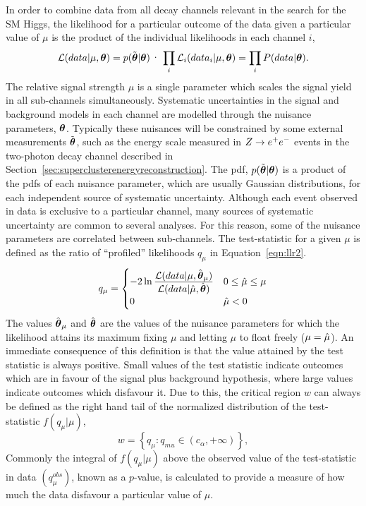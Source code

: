 In order to combine data from all decay channels relevant in the search for the
SM Higgs, the likelihood for a particular outcome of the data given a particular
value of $\mu$ is the product of the individual likelihoods in each channel $i$,
\begin{equation}
\mathcal{L}(data|\mu,\boldth)= p(\boldthmeas|\boldth)\cdot\prod_{i}\mathcal{L}_{i}(data_{i}|\mu,\boldth)
= \prod_{i}P(data|\boldth).
\label{eqn:likelihood}
\end{equation}
The relative signal strength $\mu$ is a single parameter which scales the signal
yield in all sub-channels simultaneously. 
Systematic uncertainties in the signal and background models in each channel
are modelled through the nuisance parameters, ${\boldsymbol{\theta}}$. Typically these nuisances
will be constrained by some external measurements $\tilde{{\boldsymbol{\theta}}}$, such as the energy scale
measured in $Z\rightarrow e^{+}e^{-}$ events in the two-photon decay channel described in 
Section~\ref{sec:superclusterenergyreconstruction}. 
The pdf, $p(\tilde{{\boldsymbol{\theta}}}|{\boldsymbol{\theta}})$ is a product of the pdfs of each nuisance parameter, 
which are usually Gaussian distributions, for each independent source of systematic
uncertainty.
Although each event observed in data is exclusive to a particular channel, 
many sources of systematic uncertainty are common to several analyses. For this
reason, some of the nuisance parameters are correlated between sub-channels.
The test-statistic for a given $\mu$ is defined as the ratio 
of ``profiled'' likelihoods $q_{\mu}$ in Equation~\ref{eqn:llr2}.
\begin{equation}
q_{\mu} = 
	\begin {cases} 
	-2\ln\frac{\displaystyle \mathcal{L}(data | \mu,\hat{{\boldsymbol{\theta}}}_{\mu})}
	{\displaystyle \mathcal{L}(data | \hat{\mu},\hat{{\boldsymbol{\theta}}})} 
		&  0 \le \hat{\mu} \le \mu \\
	 0 	&  \hat{\mu} < 0
	\end{cases}
\label{eqn:llr2}
\end{equation}
The values $\hat{{\boldsymbol{\theta}}}_{\mu}$ and $\hat{{\boldsymbol{\theta}}}$ are the values of 
the nuisance parameters for which the likelihood attains its maximum 
fixing $\mu$ and letting $\mu$ to float freely ($\mu=\hat{\mu}$).
An immediate consequence of this definition is that the value attained
by the test statistic is always positive. Small values of the test
statistic indicate outcomes which are in favour of the signal plus background 
hypothesis, where large values indicate outcomes which disfavour it.
Due to this, the critical region $w$ can always be defined as the right
hand tail of the normalized distribution of the test-statistic $f(q_{\mu}|\mu)$, 
\begin{equation}
w = \left\{ q_{\mu} : q_{mu} \in (c_{\alpha},+\infty) \right\},
\label{eqn:llr2}
\end{equation}
Commonly the integral of $f(q_{\mu}|\mu)$ above the observed value of the 
test-statistic in data $(q_{\mu}^{obs})$, known as a $p$-value, is calculated
to provide a measure of how much the data disfavour a particular value of $\mu$. 

